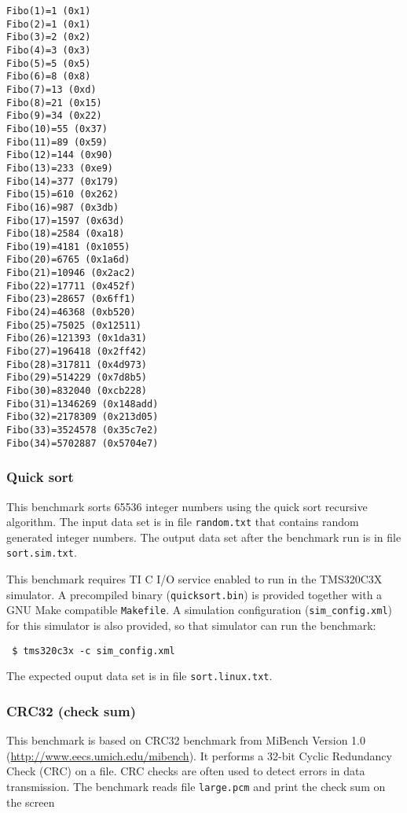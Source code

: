 \begin{verbatim}
Fibo(1)=1 (0x1)
Fibo(2)=1 (0x1)
Fibo(3)=2 (0x2)
Fibo(4)=3 (0x3)
Fibo(5)=5 (0x5)
Fibo(6)=8 (0x8)
Fibo(7)=13 (0xd)
Fibo(8)=21 (0x15)
Fibo(9)=34 (0x22)
Fibo(10)=55 (0x37)
Fibo(11)=89 (0x59)
Fibo(12)=144 (0x90)
Fibo(13)=233 (0xe9)
Fibo(14)=377 (0x179)
Fibo(15)=610 (0x262)
Fibo(16)=987 (0x3db)
Fibo(17)=1597 (0x63d)
Fibo(18)=2584 (0xa18)
Fibo(19)=4181 (0x1055)
Fibo(20)=6765 (0x1a6d)
Fibo(21)=10946 (0x2ac2)
Fibo(22)=17711 (0x452f)
Fibo(23)=28657 (0x6ff1)
Fibo(24)=46368 (0xb520)
Fibo(25)=75025 (0x12511)
Fibo(26)=121393 (0x1da31)
Fibo(27)=196418 (0x2ff42)
Fibo(28)=317811 (0x4d973)
Fibo(29)=514229 (0x7d8b5)
Fibo(30)=832040 (0xcb228)
Fibo(31)=1346269 (0x148add)
Fibo(32)=2178309 (0x213d05)
Fibo(33)=3524578 (0x35c7e2)
Fibo(34)=5702887 (0x5704e7)
\end{verbatim}

\subsubsection{Quick sort}

This benchmark sorts 65536 integer numbers using the quick sort recursive algorithm.
The input data set is in file \texttt{random.txt} that contains random generated integer numbers.
The output data set after the benchmark run is in file \texttt{sort.sim.txt}.

This benchmark requires TI C I/O service enabled to run in the TMS320C3X simulator.
A precompiled binary (\texttt{quicksort.bin}) is provided together with a GNU Make compatible \texttt{Makefile}.
A simulation configuration (\texttt{sim\_config.xml}) for this simulator is also provided, so that simulator can run the benchmark:

\begin{verbatim}
 $ tms320c3x -c sim_config.xml
\end{verbatim}

\noindent The expected ouput data set is in file \texttt{sort.linux.txt}.

\subsubsection{CRC32 (check sum)}

This benchmark is based on CRC32 benchmark from MiBench Version 1.0 (\url{http://www.eecs.umich.edu/mibench}).
It performs a 32-bit Cyclic Redundancy Check (CRC) on a file. CRC checks are often used to detect errors in data transmission.
The benchmark reads file \texttt{large.pcm} and print the check sum on the screen

